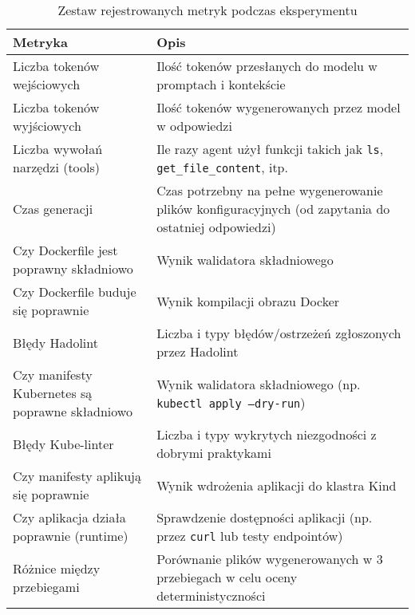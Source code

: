 \begin{table}[H]
\centering
\caption{Zestaw rejestrowanych metryk podczas eksperymentu}
\label{tab:metrics}
\begin{tabular}{|p{6cm}|p{8cm}|}
\hline
\textbf{Metryka} & \textbf{Opis} \\
\hline
Liczba tokenów wejściowych & Ilość tokenów przesłanych do modelu w promptach i kontekście \\
\hline
Liczba tokenów wyjściowych & Ilość tokenów wygenerowanych przez model w odpowiedzi \\
\hline
Liczba wywołań narzędzi (tools) & Ile razy agent użył funkcji takich jak \texttt{ls}, \texttt{get\_file\_content}, itp. \\
\hline
Czas generacji & Czas potrzebny na pełne wygenerowanie plików konfiguracyjnych (od zapytania do ostatniej odpowiedzi) \\
\hline
Czy Dockerfile jest poprawny składniowo & Wynik walidatora składniowego \\
\hline
Czy Dockerfile buduje się poprawnie & Wynik kompilacji obrazu Docker \\
\hline
Błędy Hadolint & Liczba i typy błędów/ostrzeżeń zgłoszonych przez Hadolint \\
\hline
Czy manifesty Kubernetes są poprawne składniowo & Wynik walidatora składniowego (np. \texttt{kubectl apply --dry-run}) \\
\hline
Błędy Kube-linter & Liczba i typy wykrytych niezgodności z dobrymi praktykami \\
\hline
Czy manifesty aplikują się poprawnie & Wynik wdrożenia aplikacji do klastra Kind \\
\hline
Czy aplikacja działa poprawnie (runtime) & Sprawdzenie dostępności aplikacji (np. przez \texttt{curl} lub testy endpointów) \\
\hline
Różnice między przebiegami & Porównanie plików wygenerowanych w 3 przebiegach w celu oceny deterministyczności \\
\hline
\end{tabular}
\end{table}